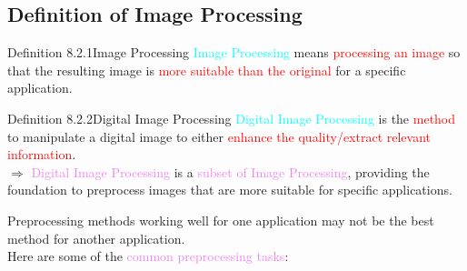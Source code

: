 \documentclass{book}
\begin{document}
\subsection{Definition of Image Processing}
\begin{defBox}{Definition 8.2.1}{Image Processing}
    \textcolor{cyan}{Image Processing} means \textcolor{red}{processing an image} so that the resulting image is \textcolor{red}{more suitable than the original} for a specific application.
\end{defBox}
\begin{defBox}{Definition 8.2.2}{Digital Image Processing}
    \textcolor{cyan}{Digital Image Processing} is the \textcolor{red}{method} to manipulate a digital image to either \textcolor{red}{enhance the quality/extract relevant information}.\\
    $\Rightarrow$ \textcolor{violet}{Digital Image Processing} is a \textcolor{violet}{subset of Image Processing}, providing the foundation to preprocess images that are more suitable for specific applications.
\end{defBox}
\newpage
Preprocessing methods working well for one application may not be the best method for another application.\\
Here are some of the \textcolor{violet}{common preprocessing tasks}:
\end{document}
